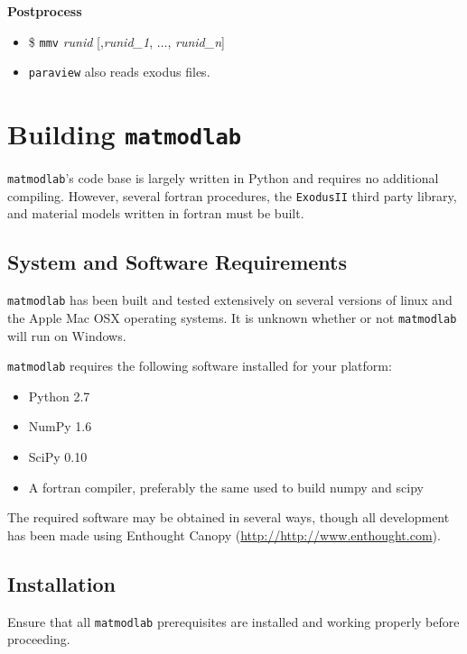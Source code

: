 \documentclass[12pt,report,strict]{SANDreport/SANDreport}
\newcommand{\mml}{\texttt{matmodlab}}
\newcommand{\mmv}{\texttt{mmv}}
\newcommand{\exodusii}{{\sc\texttt{ExodusII}}}
\newcommand{\paraview}[1]{{\sc\texttt{paraview}}}
\begin{document}
\textbf{Postprocess}
\begin{itemize}
  \item \$ \mmv{} \emph{runid} [,\emph{runid\_1}, $\ldots$,
  \emph{runid\_n}]
  \item \paraview{} also reads exodus files.
\end{itemize}


\chapter{Building \mml{}}
\label{chap:build}
\mml{}'s code base is largely written in Python and requires no additional
compiling. However, several fortran procedures, the \exodusii{} third party
library, and material models written in fortran must be built.

\section{System and Software Requirements}
\label{sec:sys}
\mml{} has been built and tested extensively on several versions of linux and
the Apple Mac OSX operating systems. It is unknown whether or not \mml{}
will run on Windows.

\mml{} requires the following software installed for your platform:

\begin{itemize}
  \item Python 2.7
  \item NumPy 1.6
  \item SciPy 0.10
  \item A fortran compiler, preferably the same used to build numpy and scipy
\end{itemize}

The required software may be obtained in several ways, though all development
has been made using Enthought Canopy (\url{http://http://www.enthought.com}).

\section{Installation}
\label{sec:install}
Ensure that all \mml{} prerequisites are installed and working properly before
proceeding.
\end{document}
